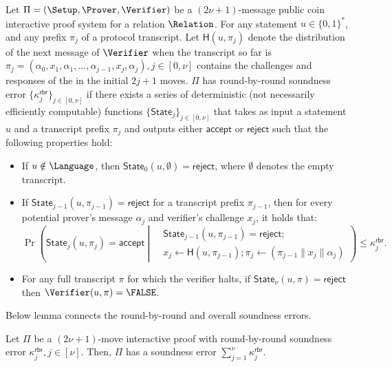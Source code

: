 \begin{definition}
	\label{def:roundByRoundSoundness}
	Let $\Pi = (\Setup, \Prover, \Verifier)$ be a $(2 \nu + 1)$-message public coin interactive proof system for a relation $\Relation$.
	For any statement $u \in \{0, 1\}^*$, and any prefix $\pi_j$ of a protocol transcript.
	Let $\mathsf{H}(u, \pi_j)$ denote the distribution of the next message of $\Verifier$ when the transcript so far is $\pi_j = (\alpha_0, x_1, \alpha_1, \ldots, \alpha_{j - 1}, x_j, \alpha_j), j \in [0, \nu]$ contains the challenges and responses of the in the initial $2j + 1$ moves.
	$\Pi$ has round-by-round soundness error $\{ \kappa^\mathsf{rbr}_{j}\}_{j \in [0, \nu]}$ if there exists a series of deterministic (not necessarily efficiently computable) functions $\{\mathsf{State}_j\}_{j \in [0, \nu]}$ that takes as input a statement $u$ and a transcript prefix $\pi_j$ and outputs either $\mathsf{accept}$ or $\mathsf{reject}$ such that the following properties hold:
		\begin{itemize}
			\item If $u \notin \Language$, then $\mathsf{State}_0(u, \emptyset) = \mathsf{reject}$, where $\emptyset$ denotes the empty transcript.
			\item If $\mathsf{State}_{j - 1}(u, \pi_{j-1}) = \mathsf{reject}$ for a transcript prefix $\pi_{j - 1}$, then for every potential prover's message $\alpha_{j}$ and verifier's challenge $x_{j}$, it holds that:
			\[
				\Pr\!\!
				\left(
					\mathsf{State}_j(u, \pi_j) = \mathsf{accept~}\!\!
					\left|~\!
						\begin{aligned}
							&\!\mathsf{State}_{j - 1}(u, \pi_{j - 1}) = \mathsf{reject}; \\
							& x_j \leftarrow \mathsf{H}(u, \pi_{j - 1}); \pi_j \leftarrow (\pi_{j - 1} \| x_j \| \alpha_j)\!
						\!\end{aligned}
					\right.
				\right)\!
				\!\le\!\kappa_j^\mathsf{rbr}.
			\]
			\item For any full transcript $\pi$ for which the verifier halts, if $\mathsf{State}_\nu(u, \pi) = \mathsf{reject}$ then $\Verifier(u, \pi) = \FALSE$.
		\end{itemize}
\end{definition}

Below lemma connects the round-by-round and overall soundness errors.
\begin{lemma}
\label{lemma:rbr}
	Let $\Pi$ be a $(2 \nu + 1)$-move interactive proof with round-by-round soundness error $\kappa_j^\mathsf{rbr}, j \in [\nu]$.
	Then, $\Pi$ has a soundness error $\sum_{j = 1}^\nu \kappa_j^\mathsf{rbr}$.
\end{lemma}

